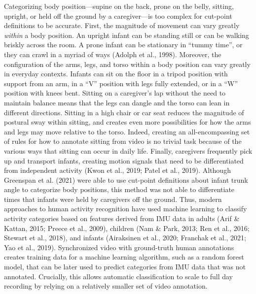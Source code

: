 \documentclass[
  man]{apa6}
\begin{document}
Categorizing body position---supine on the back, prone on the belly, sitting, upright, or held off the ground by a caregiver---is too complex for cut-point definitions to be accurate. First, the magnitude of movement can vary greatly \emph{within} a body position. An upright infant can be standing still or can be walking briskly across the room. A prone infant can be stationary in ``tummy time'', or they can crawl in a myriad of ways (Adolph et al., 1998). Moreover, the configuration of the arms, legs, and torso within a body position can vary greatly in everyday contexts. Infants can sit on the floor in a tripod position with support from an arm, in a ``V'' position with legs fully extended, or in a ``W'' position with knees bent. Sitting on a caregiver's lap without the need to maintain balance means that the legs can dangle and the torso can lean in different directions. Sitting in a high chair or car seat reduces the magnitude of postural sway within sitting, and creates even more possibilities for how the arms and legs may move relative to the torso. Indeed, creating an all-encompassing set of rules for how to annotate sitting from video is no trivial task because of the various ways that sitting can occur in daily life. Finally, caregivers frequently pick up and transport infants, creating motion signals that need to be differentiated from independent activity (Kwon et al., 2019; Patel et al., 2019). Although Greenspan et al. (2021) were able to use cut-point definitions about infant trunk angle to categorize body positions, this method was not able to differentiate times that infants were held by caregivers off the ground. Thus, modern approaches to human activity recognition have used machine learning to classify activity categories based on features derived from IMU data in adults (Arif \& Kattan, 2015; Preece et al., 2009), children (Nam \& Park, 2013; Ren et al., 2016; Stewart et al., 2018), and infants (Airaksinen et al., 2020; Franchak et al., 2021; Yao et al., 2019). Synchronized video with ground-truth human annotations creates training data for a machine learning algorithm, such as a random forest model, that can be later used to predict categories from IMU data that was not annotated. Crucially, this allows automatic classification to scale to full day recording by relying on a relatively smaller set of video annotation.
\end{document}
